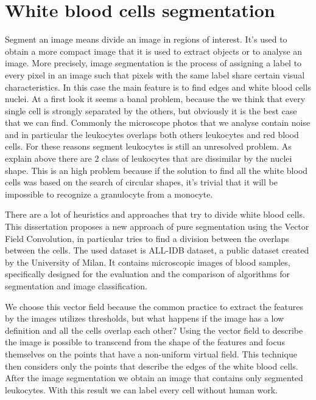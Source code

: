 \section*{White blood cells segmentation}
Segment an image means divide an image in regions of interest. It's used to obtain a more compact image that it is used to extract objects or to analyse an image. More precisely, image segmentation is the process of assigning a label to every pixel in an image such that pixels with the same label share certain visual characteristics. In this case the main feature is to find edges and white blood cells nuclei. At a first look it seems a banal problem, because the we think that every single cell is strongly separated by the others, but obviously it is the best case that we can find. Commonly the microscope photos that we analyse contain noise and in particular the leukocytes overlaps both others leukocytes and red blood cells. For these reasons segment leukocytes is still an unresolved problem. As explain above there are 2 class of leukocytes that are dissimilar by the nuclei shape. This is an high problem because if the solution to find all the white blood cells was based on the search of circular shapes, it's trivial that it will be impossible to recognize a granulocyte from a monocyte.


\bigskip


There are a lot of heuristics and approaches that try to divide white blood cells. This dissertation proposes a new approach of pure segmentation using the Vector Field Convolution, in particular tries to find a division between the overlaps between the cells. The used dataset is ALL-IDB dataset, a public dataset created by the University of Milan. It contains microscopic images of blood samples, specifically designed for the evaluation and the comparison of algorithms for segmentation and image classification.


\bigskip 


We choose this vector field because the common practice to extract the features by the images utilizes thresholds, but what happens if the image has a low definition and all the cells overlap each other? Using the vector field to describe the image is possible to transcend from the shape of the features and focus themselves on the points that have a non-uniform virtual field. This technique then considers only the points that describe the edges of the white blood cells. After the image segmentation we obtain an image that contains only segmented leukocytes. With this result we can label every cell without human work.


